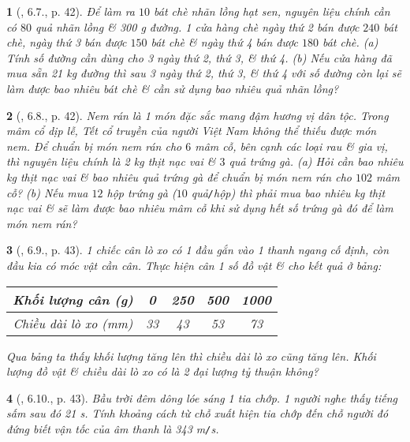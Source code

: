 \documentclass{article}
\newtheorem{baitoan}{}
\begin{document}
\begin{baitoan}[\cite{Binh_boi_duong_Toan_7_tap_1}, 6.7., p. 42]
	Để làm ra $10$ bát chè nhãn lồng hạt sen, nguyên liệu chính cần có $80$ quả nhãn lồng \& {\rm300 g} đường. 1 cửa hàng chè ngày thứ 2 bán được $240$ bát chè, ngày thứ 3 bán được $150$ bát chè \& ngày thứ 4 bán được $180$ bát chè. (a) Tính số đường cần dùng cho 3 ngày thứ 2, thứ 3, \& thứ 4. (b) Nếu cửa hàng đã mua sẵn {\rm21 kg} đường thì sau 3 ngày thứ 2, thứ 3, \& thứ 4 với số đường còn lại sẽ làm được bao nhiêu bát chè \& cần sử dụng bao nhiêu quả nhãn lồng?
\end{baitoan}

\begin{baitoan}[\cite{Binh_boi_duong_Toan_7_tap_1}, 6.8., p. 42]
	Nem rán là 1 món đặc sắc mang đậm hương vị dân tộc. Trong mâm cổ dịp lễ, Tết cổ truyền của người Việt Nam không thể thiếu được món nem. Để chuẩn bị món nem rán cho $6$ mâm cỗ, bên cạnh các loại rau \& gia vị, thì nguyên liệu chính là {\rm2 kg} thịt nạc vai \& $3$ quả trứng gà. (a) Hỏi cần bao nhiêu {\rm kg} thịt nạc vai \& bao nhiêu quả trứng gà để chuẩn bị món nem rán cho $102$ mâm cỗ? (b) Nếu mua $12$ hộp trứng gà ($10$ quả{\tt/}hộp) thì phải mua bao nhiêu {\rm kg} thịt nạc vai \& sẽ làm được bao nhiêu mâm cỗ khi sử dụng hết số trứng gà đó để làm món nem rán?
\end{baitoan}

\begin{baitoan}[\cite{Binh_boi_duong_Toan_7_tap_1}, 6.9., p. 43]
	1 chiếc cân lò xo có 1 đầu gắn vào 1 thanh ngang cố định, còn đầu kia có móc vật cần cân. Thực hiện cân 1 số đồ vật \& cho kết quả ở bảng:
	\begin{table}[H]
		\centering
		\begin{tabular}{|c|c|c|c|c|}
			\hline
			Khối lượng cân (g) & 0 & 250 & 500 & 1000 \\
			\hline
			Chiều dài lò xo (mm) & 33 & 43 & 53 & 73 \\
			\hline
		\end{tabular}
	\end{table}
	\noindent Qua bảng ta thấy khối lượng tăng lên thì chiều dài lò xo cũng tăng lên. Khối lượng đồ vật \& chiều dài lò xo có là 2 đại lượng tỷ thuận không?
\end{baitoan}

\begin{baitoan}[\cite{Binh_boi_duong_Toan_7_tap_1}, 6.10., p. 43]
	Bầu trời đêm dông lóe sáng 1 tia chớp. 1 người nghe thấy tiếng sấm sau đó {\rm21 s}. Tính khoảng cách từ chỗ xuất hiện tia chớp đến chỗ người đó đứng biết vận tốc của âm thanh là {\rm343 m{\tt/}s}.
\end{baitoan}
\end{document}
